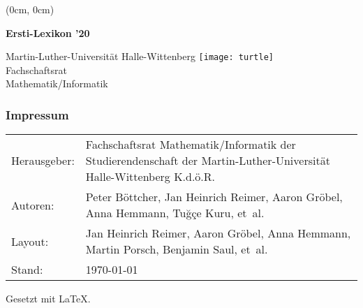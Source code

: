\thispagestyle{empty}
\pagecolor{coverbackground}
\color{white}
{
    \setlength{\parindent}{0pt}
    \sffamily
    \begin{textblock*}{\textwidth}(0cm, 0cm)%
        \begin{sideways}
            \begin{minipage}{\textheight}
                \fontsize{1.5cm}{1.5cm}\selectfont%
                \bfseries
                \hspace{-0.1em}
                Ersti-Lexikon ’20
                \hfill
            \end{minipage}
        \end{sideways}%
    \end{textblock*}
    {
        \fontsize{0.45cm}{0.45cm}\selectfont
        Martin-Luther-Universität \hfill
        Halle-Wittenberg
    }
    \vfill
    \texttt{[image: turtle]} \\[0.5cm]
    {%
        \fontsize{0.675cm}{0.675cm}\selectfont
        Fachschaftsrat \\[0.5ex]
        Mathematik/Informatik
    }%
}%
\newpage
\restoregeometry
\nopagecolor
\color{black}

\thispagestyle{empty}
\subsubsection{Impressum}
\begin{tabu} to 
    Herausgeber: & Fachschaftsrat Mathematik/Informatik der
        Studierendenschaft der Martin-Luther-Universität Halle-Wittenberg K.d.ö.R. \\
    Autoren: &
        Peter Böttcher,
        Jan Heinrich Reimer,
        Aaron Gröbel,
        Anna Hemmann,
        Tuğçe Kuru,
        et~al. \\
    Layout: & 
        Jan Heinrich Reimer,
        Aaron Gröbel,
        Anna Hemmann,
        Martin Porsch,
        Benjamin Saul, 
        et~al. \\
    Stand: & \today
\end{tabu}
{\scriptsize Gesetzt mit \LaTeX.}
\newpage

